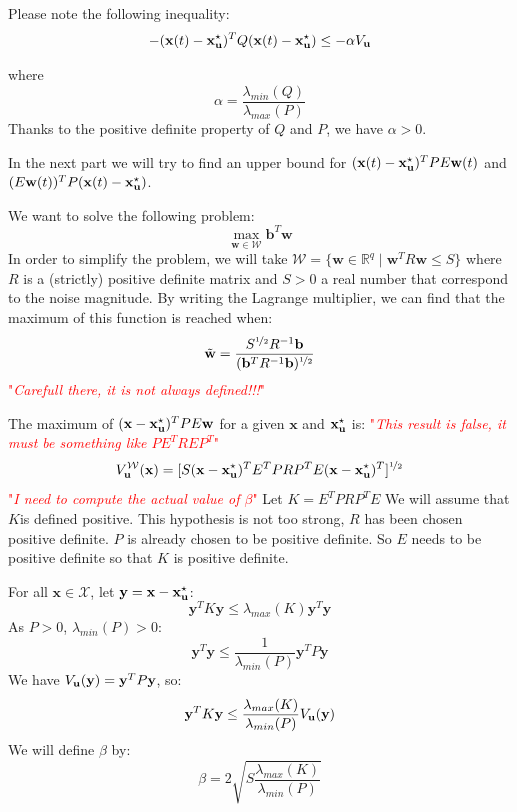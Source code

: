 \documentclass{article}
\theoremstyle{named}
\newcommand{\vect}[1]{\ensuremath{ \mathbf{#1}}}
\newcommand\comment[1]{\textcolor{red}{"\textit{#1}"}}
\begin{document}
Please note the following inequality:
\begin{equation}
- (\vect{x}(t) - \xu)^T Q (\vect{x}(t) - \xu) \leq - \alpha \Vu
\end{equation}

where
\begin{equation}
\alpha = \frac{\lambda_{min}(Q)}{\lambda_{max}(P)}
\end{equation}
Thanks to the positive definite property of $Q$ and $P$, we have $\alpha>0$.

In the next part we will try to find an upper bound for $(\vect{x}(t) - \xu)^T P E \vect{w}(t)$ and $(E \vect{w}(t))^T P (\vect{x}(t) - \xu)$.

We want to solve the following problem:
\begin{equation} \label{eq:max_w}
\max_{\vect{w} \in \mathcal{W}} \vect{b}^T \vect{w}
\end{equation}
In order to simplify the problem, we will take $\mathcal{W} = \{ \vect{w} \in \mathbb{R}^q \mid \vect{w}^T R \vect{w} \leq S\}$ where $R$ is a (strictly) positive definite matrix and $S>0$ a real number that correspond to the noise magnitude.
By writing the Lagrange multiplier, we can find that the maximum of this function is reached when:
\begin{equation}
\tilde{\vect{w}} = \frac{S^{\nicefrac{1}{2}} R^{-1} \vect{b}}{(\vect{b}^T R^{-1} \vect{b})^{\nicefrac{1}{2}}}
\end{equation}
\comment{Carefull there, it is not always defined!!!}

The maximum of $(\vect{x} - \xu)^T P E \vect{w}$ for a given $\vect{x}$ and $\xu$ is:
\newcommand{\Vwu}{V_{\vect{u}}^{\mathcal{W}}}
\comment{This result is false, it must be something like $P E^T R E P^T $}
\begin{equation}
\Vwu(\vect{x}) = [S (\vect{x} -\xu)^T E^T P R P^T E (\vect{x} -\xu)^T ]^{\nicefrac{1}{2}}
\end{equation}
\comment{I need to compute the actual value of $\beta$}
Let $K = E^T P R P^T E$
We will assume that $K$is defined positive.
This hypothesis is not too strong, $R$ has been chosen positive definite.
$P$ is already chosen to be positive definite.
So $E$ needs to be positive definite so that $K$ is positive definite.

For all $\vect{x} \in \mathcal{X}$, let $\vect{y} = \vect{x} -\xu$:
$$\vect{y}^T K \vect{y} \leq  \lambda_{max}(K) \vect{y}^T \vect{y}$$
As $P>0$, $\lambda_{min}(P)>0$:
$$\vect{y}^T \vect{y} \leq \frac{1}{\lambda_{min}(P)}  \vect{y}^T P \vect{y}$$
We have $\Vu(\vect{y}) = \vect{y}^T P \vect{y}$, so:
$$\vect{y}^T K \vect{y} \leq \frac{\lambda_{max}(K)}{\lambda_{min}(P)}  \Vu(\vect{y})$$
\newcommand{\Bu}{\beta}
We will define $\Bu$ by:
$$\Bu = 2\sqrt{S \frac{\lambda_{max}(K)}{\lambda_{min}(P)} }$$
\end{document}
